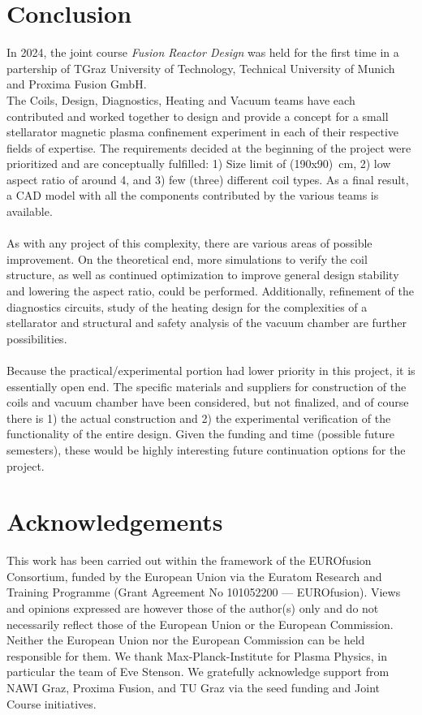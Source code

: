 \section{Conclusion}
In 2024, the joint course \textit{Fusion Reactor Design} was held for the first time in a partership of TGraz University of Technology, Technical University of Munich and Proxima Fusion GmbH.
\\
The Coils, Design, Diagnostics, Heating and Vacuum teams have each contributed and worked together to design and provide a concept for a small stellarator magnetic plasma confinement experiment in each of their respective fields of expertise. The requirements decided at the beginning of the project were prioritized and are conceptually fulfilled: 1) Size limit of (190x90)~cm, 2) low aspect ratio of around 4, and 3) few (three) different coil types. As a final result, a CAD model with all the components contributed by the various teams is available.\\
\\
As with any project of this complexity, there are various areas of possible improvement. On the theoretical end, more simulations to verify the coil structure, as well as continued optimization to improve general design stability and lowering the aspect ratio, could be performed. Additionally, refinement of the diagnostics circuits, study of the heating design for the complexities of a stellarator and structural and safety analysis of the vacuum chamber are further possibilities.\\
\\
Because the practical/experimental portion had lower priority in this project, it is essentially open end. The specific materials and suppliers for construction of the coils and vacuum chamber have been considered, but not finalized, and of course there is 1) the actual construction and 2) the experimental verification of the functionality of the entire design. Given the funding and time (possible future semesters), these would be highly interesting future continuation options for the project.

\section*{Acknowledgements} This work has been carried out within the framework of the EUROfusion Consortium, funded by the European Union via the Euratom Research and Training Programme (Grant Agreement No 101052200 — EUROfusion). Views and opinions expressed are however those of the author(s) only and do not necessarily reflect those of the European Union or the European Commission. Neither the European Union nor the European Commission can be held responsible for them. We thank Max-Planck-Institute for Plasma Physics, in particular the team of Eve Stenson. We gratefully acknowledge support from NAWI Graz, Proxima Fusion, and TU Graz via the seed funding and Joint Course initiatives.
